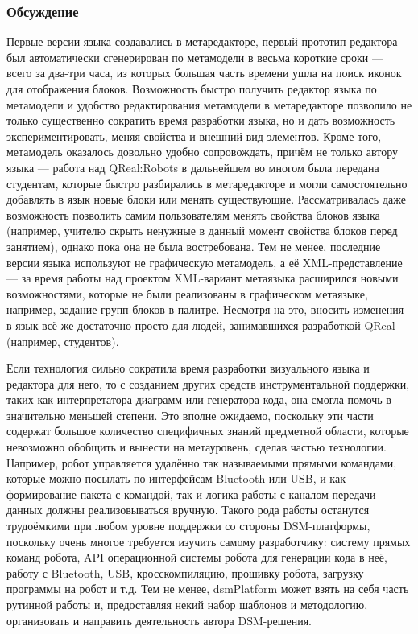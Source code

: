 \subsubsection{Обсуждение}
Первые версии языка создавались в метаредакторе, первый прототип редактора был автоматически 
сгенерирован по метамодели в весьма короткие сроки --- всего за два-три часа, из которых 
большая часть времени ушла на поиск иконок для отображения блоков. Возможность быстро 
получить редактор языка по метамодели и удобство редактирования метамодели в метаредакторе 
позволило не только существенно сократить время разработки языка, но и дать возможность 
экспериментировать, меняя свойства и внешний вид элементов. Кроме того, метамодель 
оказалось довольно удобно сопровождать, причём не только автору языка --- работа над 
QReal:Robots в дальнейшем во многом была передана студентам, которые быстро разбирались 
в метаредакторе и могли самостоятельно добавлять в язык новые блоки или менять существующие. 
Рассматривалась даже возможность позволить самим пользователям менять свойства блоков 
языка (например, учителю скрыть ненужные в данный момент свойства блоков перед занятием), 
однако пока она не была востребована. Тем не менее, последние версии языка используют 
не графическую метамодель, а её XML-представление --- за время работы над проектом 
XML-вариант метаязыка расширился новыми возможностями, которые не были реализованы 
в графическом метаязыке, например, задание групп блоков в палитре. Несмотря на это, 
вносить изменения в язык всё же достаточно просто для людей, занимавшихся разработкой 
QReal (например, студентов).

Если технология сильно сократила время разработки визуального языка и редактора для 
него, то с созданием других средств инструментальной поддержки, таких как интерпретатора 
диаграмм или генератора кода, она смогла помочь в значительно меньшей степени. Это 
вполне ожидаемо, поскольку эти части содержат большое количество специфичных знаний 
предметной области, которые невозможно обобщить и вынести на метауровень, сделав частью 
технологии. Например, робот управляется удалённо так называемыми прямыми командами, 
которые можно посылать по интерфейсам Bluetooth или USB, и как формирование пакета 
с командой, так и логика работы с каналом передачи данных должны реализовываться вручную. 
Такого рода работы останутся трудоёмкими при любом уровне поддержки со стороны \ac{DSM}-платформы, 
поскольку очень многое требуется изучить самому разработчику: систему прямых команд 
робота, API операционной системы робота для генерации кода в неё, работу с Bluetooth, 
USB, кросскомпиляцию, прошивку робота, загрузку программы на робот и т.д. Тем не менее, 
\ac{dsmPlatform} может взять на себя часть рутинной работы и, предоставляя некий набор 
шаблонов и методологию, организовать и направить деятельность автора \ac{DSM}-решения.

